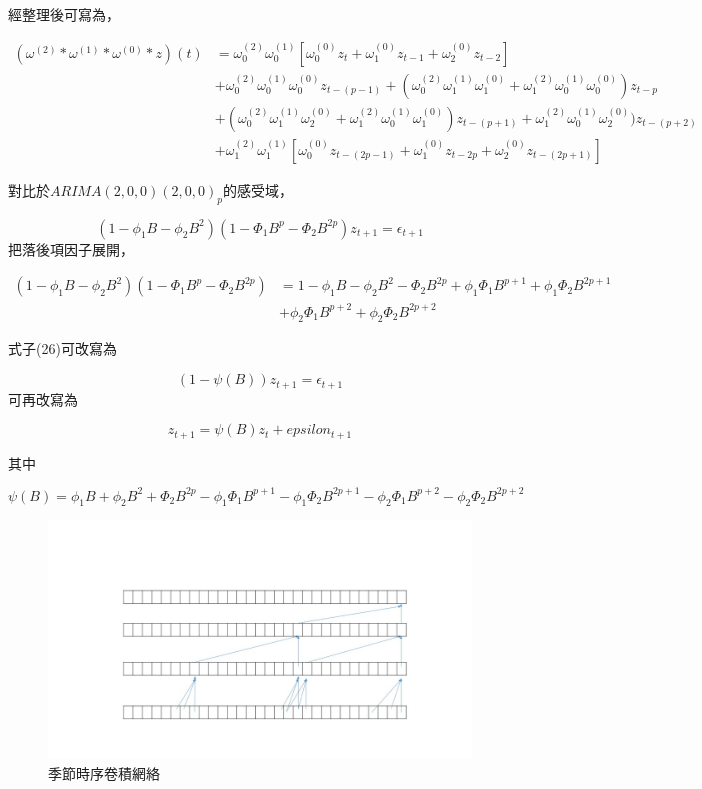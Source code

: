 \documentclass[oneside]{book}
\begin{document}
經整理後可寫為，

\begin{align*}
(\omega^{(2)}*\omega^{(1)}*\omega^{(0)}*z)(t) &=\omega^{(2)}_0\omega^{(1)}_0[\omega^{(0)}_0z_t+\omega^{(0)}_1z_{t-1}+\omega^{(0)}_2z_{t-2}]\\
&+\omega^{(2)}_0\omega^{(1)}_0\omega^{(0)}_0z_{t-(p-1)}+(\omega^{(2)}_0\omega^{(1)}_1\omega^{(0)}_1+\omega^{(2)}_1\omega^{(1)}_0\omega^{(0)}_0)z_{t-p}\\
&+(\omega^{(2)}_0\omega^{(1)}_1\omega^{(0)}_2+\omega^{(2)}_1\omega^{(1)}_0\omega^{(0)}_1)z_{t-(p+1)}+\omega^{(2)}_1\omega^{(1)}_0\omega^{(0)}_2)z_{t-(p+2)}\\
&+\omega^{(2)}_1\omega^{(1)}_1[\omega^{(0)}_0z_{t-(2p-1)}+\omega^{(0)}_1z_{t-2p}+\omega^{(0)}_2z_{t-(2p+1)}]
\end{align*}

對比於\(ARIMA(2,0,0)(2,0,0)_p\)的感受域，

\[(1-\phi_1B-\phi_2B^2)(1-\Phi_1B^p-\Phi_2B^{2p})z_{t+1}=\epsilon_{t+1}\]
把落後項因子展開，

\begin{align*}
(1-\phi_1B-\phi_2B^2)(1-\Phi_1B^p-\Phi_2B^{2p}) &= 1-\phi_1B-\phi_2B^2-\Phi_2B^{2p}+\phi_1\Phi_1B^{p+1}+\phi_1\Phi_2B^{2p+1}\\
&+\phi_2\Phi_1B^{p+2}+\phi_2\Phi_2B^{2p+2}
\end{align*}

式子(26)可改寫為

\[(1-\psi(B))z_{t+1} = \epsilon_{t+1}\]
可再改寫為

\[z_{t+1} = \psi(B)z_t+epsilon_{t+1}\]

其中

\[\psi(B)=\phi_1B+\phi_2B^2+\Phi_2B^{2p}-\phi_1\Phi_1B^{p+1}-\phi_1\Phi_2B^{2p+1}-\phi_2\Phi_1B^{p+2}-\phi_2\Phi_2B^{2p+2}\]

\begin{figure}

{\centering \includegraphics[width=.6\linewidth]{./fig/STCN_model} 

}

\caption{季節時序卷積網絡}\label{fig:STCNmodel}
\end{figure}
\end{document}
